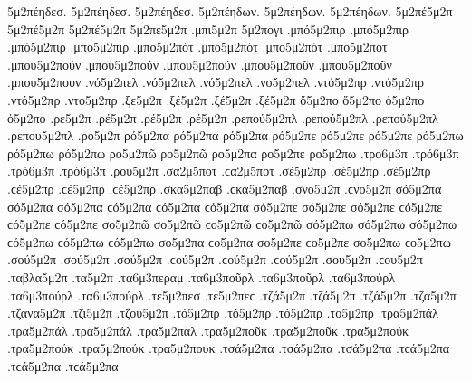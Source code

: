 {5μ2πέηδεσ. 5μ2πέηδεσ. 5μ2πέηδεσ. 
5μ2πέηδων. 5μ2πέηδων. 5μ2πέηδων. 
5μ2πέ5μ2π 5μ2πέ5μ2π 5μ2πέ5μ2π   %
5μ2πε5μ2π 
.μπι5μ2π   %
5μ2πογι   %
.μπό5μ2πιρ .μπό5μ2πιρ .μπό5μ2πιρ   %
.μπο5μ2πιρ   %
.μπο5μ2πότ .μπο5μ2πότ .μπο5μ2πότ   %
.μπο5μ2ποτ 
.μπου5μ2πούν .μπου5μ2πούν .μπου5μ2πούν   %
.μπου5μ2ποῦν .μπου5μ2ποῦν 
.μπου5μ2πουν 
.νό5μ2πελ .νό5μ2πελ .νό5μ2πελ   %
.νο5μ2πελ 
.ντό5μ2πρ .ντό5μ2πρ .ντό5μ2πρ   %
.ντο5μ2πρ 
.ξε5μ2π   %
.ξέ5μ2π .ξέ5μ2π .ξέ5μ2π 
ὄ5μ2πο ὄ5μ2πο   %
ὀ5μ2πο ὀ5μ2πο 
.ρε5μ2π   %
.ρέ5μ2π .ρέ5μ2π .ρέ5μ2π   %
.ρεπού5μ2πλ .ρεπού5μ2πλ .ρεπού5μ2πλ   %
.ρεπου5μ2πλ   %
.ρο5μ2π   %
ρό5μ2πα ρό5μ2πα ρό5μ2πα   %
ρό5μ2πε ρό5μ2πε ρό5μ2πε 
ρό5μ2πω ρό5μ2πω ρό5μ2πω 
ρο5μ2πῶ ρο5μ2πῶ 
ρο5μ2πα 
ρο5μ2πε 
ρο5μ2πω 
.τρο6μ3π   %
.τρό6μ3π .τρό6μ3π .τρό6μ3π   %
.ρου5μ2π   %
.σα2μ5ποτ .ϲα2μ5ποτ   %
.σέ5μ2πρ .σέ5μ2πρ .σέ5μ2πρ .ϲέ5μ2πρ .ϲέ5μ2πρ .ϲέ5μ2πρ   %
.σκα5μ2παβ .ϲκα5μ2παβ   %
.σνο5μ2π .ϲνο5μ2π   %
σό5μ2πα σό5μ2πα σό5μ2πα ϲό5μ2πα ϲό5μ2πα ϲό5μ2πα   %
σό5μ2πε σό5μ2πε σό5μ2πε ϲό5μ2πε ϲό5μ2πε ϲό5μ2πε 
σο5μ2πῶ σο5μ2πῶ ϲο5μ2πῶ ϲο5μ2πῶ 
σό5μ2πω σό5μ2πω σό5μ2πω ϲό5μ2πω ϲό5μ2πω ϲό5μ2πω 
σο5μ2πα ϲο5μ2πα 
σο5μ2πε ϲο5μ2πε 
σο5μ2πω ϲο5μ2πω 
.σού5μ2π .σού5μ2π .σού5μ2π .ϲού5μ2π .ϲού5μ2π .ϲού5μ2π   %
.σου5μ2π .ϲου5μ2π 
.ταβλα5μ2π   %
.τα5μ2π   %
.τα6μ3περαμ   %
.τα6μ3ποῦρλ .τα6μ3ποῦρλ   %
.τα6μ3πούρλ .τα6μ3πούρλ .τα6μ3πούρλ 
.τε5μ2πεσ .τε5μ2πεϲ   %
.τζά5μ2π .τζά5μ2π .τζά5μ2π   %
.τζα5μ2π 
.τζανα5μ2π   %
.τζι5μ2π   %
.τζου5μ2π   %
.τό5μ2πρ .τό5μ2πρ .τό5μ2πρ   %
.το5μ2πρ 
.τρα5μ2πάλ .τρα5μ2πάλ .τρα5μ2πάλ   %
.τρα5μ2παλ 
.τρα5μ2ποῦκ .τρα5μ2ποῦκ   %
.τρα5μ2πούκ .τρα5μ2πούκ .τρα5μ2πούκ 
.τρα5μ2πουκ 
.τσά5μ2πα .τσά5μ2πα .τσά5μ2πα .τϲά5μ2πα .τϲά5μ2πα .τϲά5μ2πα   %
}
